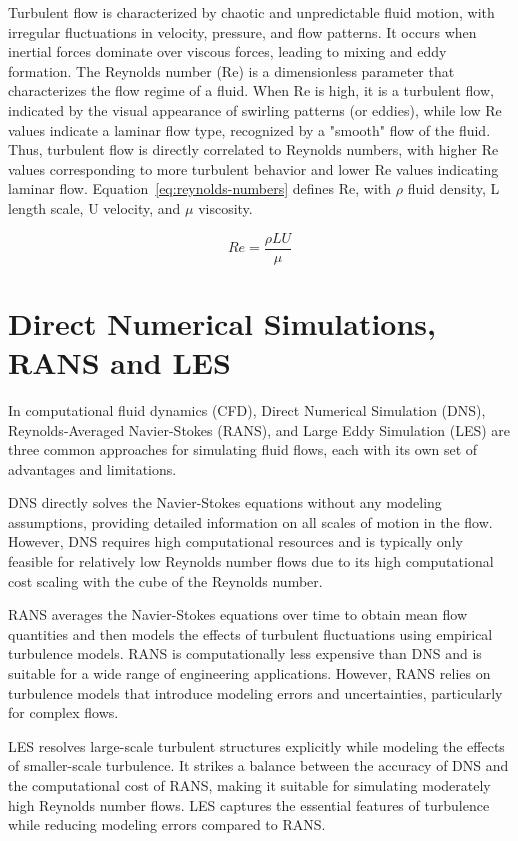 Turbulent flow is characterized by chaotic and unpredictable fluid motion, with irregular fluctuations in velocity, pressure, and flow patterns. It occurs when inertial forces dominate over viscous forces, leading to mixing and eddy formation. The Reynolds number (Re) is a dimensionless parameter that characterizes the flow regime of a fluid. When Re is high, it is a turbulent flow, indicated by the visual appearance of swirling patterns (or eddies), while low Re values indicate a laminar flow type, recognized by a "smooth" flow of the fluid. Thus, turbulent flow is directly correlated to Reynolds numbers, with higher Re values corresponding to more turbulent behavior and lower Re values indicating laminar flow. Equation~\ref{eq:reynolds-numbers} defines Re, with $\rho$ fluid density, L length scale, U velocity, and $\mu$ viscosity.

\begin{equation}
    Re = \frac{\rho LU}{\mu}
    \label{eq:reynolds-numbers}
\end{equation}

\section{Direct Numerical Simulations, RANS and LES}
\label{sec:DirectNumericalSimulationsRANSAndLES} 

In computational fluid dynamics (CFD), Direct Numerical Simulation (DNS), Reynolds-Averaged Navier-Stokes (RANS), and Large Eddy Simulation (LES) are three common approaches for simulating fluid flows, each with its own set of advantages and limitations.

DNS directly solves the Navier-Stokes equations without any modeling assumptions, providing detailed information on all scales of motion in the flow. However, DNS requires high computational resources and is typically only feasible for relatively low Reynolds number flows due to its high computational cost scaling with the cube of the Reynolds number.

RANS averages the Navier-Stokes equations over time to obtain mean flow quantities and then models the effects of turbulent fluctuations using empirical turbulence models. RANS is computationally less expensive than DNS and is suitable for a wide range of engineering applications. However, RANS relies on turbulence models that introduce modeling errors and uncertainties, particularly for complex flows.

LES resolves large-scale turbulent structures explicitly while modeling the effects of smaller-scale turbulence. It strikes a balance between the accuracy of DNS and the computational cost of RANS, making it suitable for simulating moderately high Reynolds number flows. LES captures the essential features of turbulence while reducing modeling errors compared to RANS.

